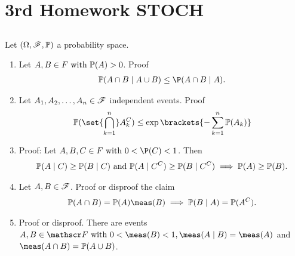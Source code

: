 
\section{3rd Homework STOCH}
\subsection{}
Let $(\Omega, \mathscr{F}, \mathbb{P})$ a probability space.
\begin{enumerate}
	\item Let $A,B \in F \text{ with } \mathbb{P}(A) >0$. Proof
	\begin{align*}
		\Meas(A\cap B \mid A\cup B) \le \P(A \cap B \mid A).
	\end{align*}
	\item Let $A_1 , A_2 , \dots , A_n \in \mathscr{F}$ independent events. Proof
	\begin{align*}
		\Meas(\set{\bigcap_{k=1}^n} A^C_k) \le \exp\brackets{- \sum_{k=1}^{n} \Meas(A_k)}
	\end{align*}
	\item Proof: Let $A,B,C \in F \with 0 < \P(C) < 1$. Then
	\begin{align*}
		\mathbb{P}(A\mid C) \ge \mathbb{P}(B \mid C) \text{ and } \mathbb{P}(A \mid C^C) \ge \mathbb{P}(B \mid C^C) \implies \mathbb{P}(A) \ge \mathbb{P}(B).
	\end{align*}
	\item Let $A, B \in \mathscr{F}$. Proof or disproof the claim
	\begin{align*}
		\Meas(A\cap B) = \Meas(A)\meas(B) \implies \Meas(B \mid A) = \Meas(A^C).
	\end{align*}
	\item Proof or disproof. There are events $A,B \in \F \with 0 < \meas(B) < 1, \meas(A\mid B) = \meas(A)$ and $\meas(A \cap B) = \Meas(A \cup B)$.
	\begin{align*}
	\end{align*}
\end{enumerate}

